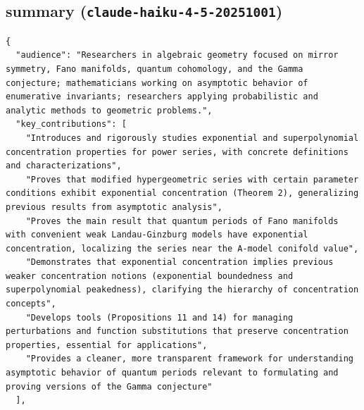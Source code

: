 \documentclass[11pt]{article}
\begin{document}
\subsection*{summary (\texttt{claude-haiku-4-5-20251001})}
\begin{verbatim}
{
  "audience": "Researchers in algebraic geometry focused on mirror symmetry, Fano manifolds, quantum cohomology, and the Gamma conjecture; mathematicians working on asymptotic behavior of enumerative invariants; researchers applying probabilistic and analytic methods to geometric problems.",
  "key_contributions": [
    "Introduces and rigorously studies exponential and superpolynomial concentration properties for power series, with concrete definitions and characterizations",
    "Proves that modified hypergeometric series with certain parameter conditions exhibit exponential concentration (Theorem 2), generalizing previous results from asymptotic analysis",
    "Proves the main result that quantum periods of Fano manifolds with convenient weak Landau-Ginzburg models have exponential concentration, localizing the series near the A-model conifold value",
    "Demonstrates that exponential concentration implies previous weaker concentration notions (exponential boundedness and superpolynomial peakedness), clarifying the hierarchy of concentration concepts",
    "Develops tools (Propositions 11 and 14) for managing perturbations and function substitutions that preserve concentration properties, essential for applications",
    "Provides a cleaner, more transparent framework for understanding asymptotic behavior of quantum periods relevant to formulating and proving versions of the Gamma conjecture"
  ],

\end{verbatim}
\end{document}
